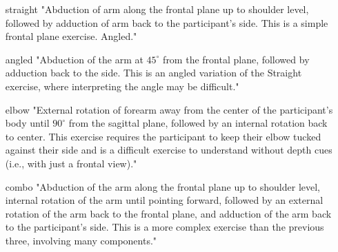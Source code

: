 \begin{itemize}
	\item[straight] "Abduction of arm along the frontal plane up to shoulder level, followed by adduction of arm back to the participant’s side. This is a simple frontal plane exercise.
	Angled."
	\item[angled] "Abduction of the arm at $45^\circ$ from the frontal plane, followed by adduction back to the side. This is an angled variation of the Straight exercise, where interpreting the angle may be difficult."
	\item[elbow] "External rotation of forearm away from the center of the participant’s body until $90^\circ$ from the sagittal plane, followed by an internal rotation back to center. This exercise requires the participant to keep their elbow tucked against their side and is a difficult exercise to understand without depth cues (i.e., with just a frontal view)."
	\item[combo] "Abduction of the arm along the frontal plane up to shoulder level, internal rotation of the arm until pointing forward, followed by an external rotation of the arm back to the frontal plane, and adduction of the arm back to the participant’s side. This is a more complex exercise than the previous three, involving many components."
\end{itemize}

